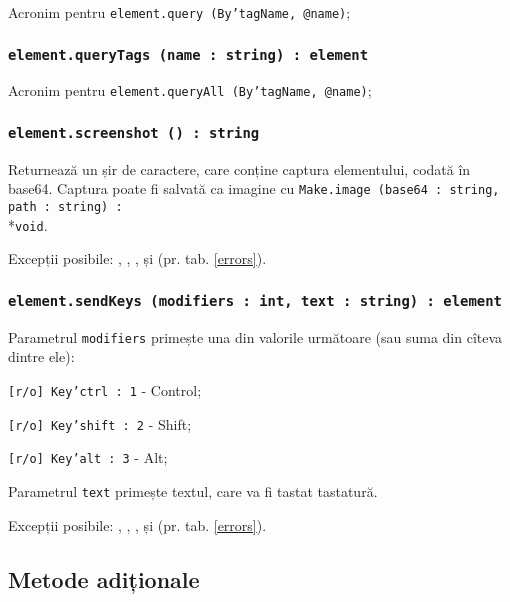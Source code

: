 Acronim pentru \texttt{element.query (By'tagName, @name)};

\subsubsection{\texttt{element.queryTags (name : string) : element}}

Acronim pentru \texttt{element.queryAll (By'tagName, @name)};

\subsubsection{\texttt{element.screenshot () : string}}

Returnează un șir de caractere, care conține captura elementului, codată în base64. Captura poate fi salvată ca imagine cu \texttt{Make.image (base64 : string, path : string) :}\\*\texttt{void}.

Excepții posibile: , , ,  și  (pr. tab. \ref{errors}).

\subsubsection{\texttt{element.sendKeys (modifiers : int, text : string) : element}}

Parametrul \texttt{modifiers} primește una din valorile următoare (sau suma din cîteva dintre ele):
\begin{icItems}
	\item \texttt{[r/o] Key'ctrl : 1} - Control;
	\item \texttt{[r/o] Key'shift : 2} - Shift;
	\item \texttt{[r/o] Key'alt : 3} - Alt;
\end{icItems}

Parametrul \texttt{text} primește textul, care va fi tastat tastatură.

Excepții posibile: , , ,   și  (pr. tab. \ref{errors}).

\subsection{Metode adiționale}

